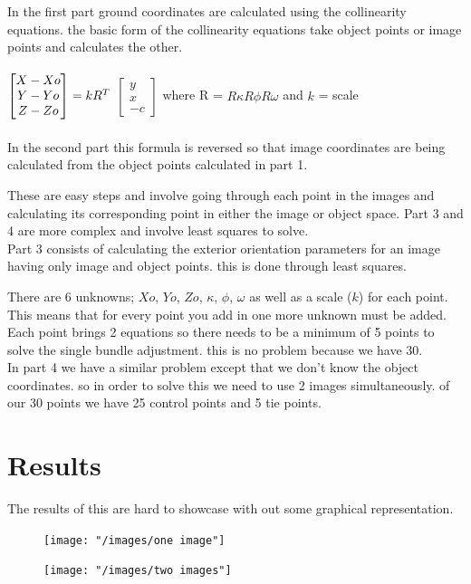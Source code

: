 \documentclass[11pt,a4paper]{article}
\begin{document}
	In the first part ground coordinates are calculated using the collinearity equations. the basic form of the collinearity equations take object points or image points and calculates the other.\\
	\\
	
	$
	\centering
	\begin{bmatrix}
		X - Xo \\ 
		Y - Yo \\ 
		Z - Zo
	\end{bmatrix}= kR^T$
	$
	\begin{bmatrix}
		y \\ 
		x \\ 
		-c
	\end{bmatrix}
	$
	where R = $R\kappa R\phi R\omega$ and $k$ = scale\\
	\\
	
	In the second part this formula is reversed so that image coordinates are being calculated from the object points calculated in part 1.
	
	These are easy steps and involve going through each point in the images and calculating its corresponding point in either the image or object space. Part 3 and 4 are more complex and involve least squares to solve.\\
	
	Part 3 consists of calculating the exterior orientation parameters for an image having only image and object points. this is done through least squares. 
	
	There are 6 unknowns; $Xo$, $Yo$, $Zo$, $\kappa$, $\phi$, $\omega$ as well as a scale ($k$) for each point. This means that for every point you add in one more unknown must be added. Each point brings 2 equations so there needs to be a minimum of 5 points to solve the single bundle adjustment. this is no problem because we have 30.\\
	
	In part 4 we have a similar problem except that we don't know the object coordinates. so in order to solve this we need to use 2 images simultaneously. of our 30 points we have 25 control points and 5 tie points.
	
	
	\section{Results}
	
	The results of this are hard to showcase with out some graphical representation.
	
	
\begin{figure}[H]
\centering
\texttt{[image: "/images/one image"]}
\caption{}
\label{fig:oneimage}
\end{figure}
	
\begin{figure}[H]
\centering
\texttt{[image: "/images/two images"]}
\caption{}
\label{fig:twoimages}
\end{figure}

	
\end{document}

